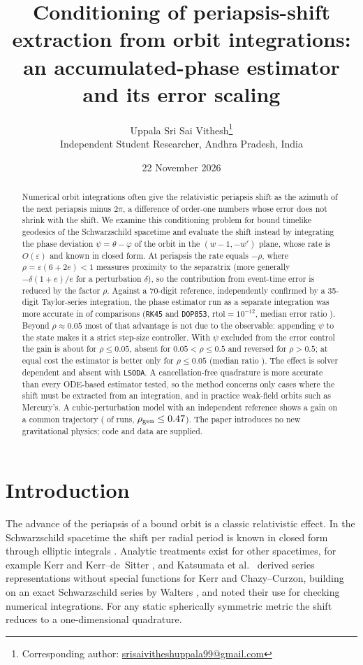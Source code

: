\documentclass[11pt,a4paper]{article}
\title{Conditioning of periapsis-shift extraction from orbit integrations:\\
an accumulated-phase estimator and its error scaling}
\author{Uppala Sri Sai Vithesh\thanks{Corresponding author: \href{mailto:srisaivitheshuppala99@gmail.com}{srisaivitheshuppala99@gmail.com}}\\
\small Independent Student Researcher, Andhra Pradesh, India}
\date{22 November 2026}
\begin{document}
\maketitle

\begin{abstract}
Numerical orbit integrations often give the relativistic periapsis shift as the azimuth of the next periapsis minus $2\pi$, a difference of order-one numbers whose error does not shrink with the shift. We examine this conditioning problem for bound timelike geodesics of the Schwarzschild spacetime and evaluate the shift instead by integrating the phase deviation $\psi=\theta-\varphi$ of the orbit in the $(w-1,-w')$ plane, whose rate is $O(\varepsilon)$ and known in closed form. At periapsis the rate equals $-\rho$, where $\rho=\varepsilon(6+2e)<1$ measures proximity to the separatrix (more generally $-\delta(1+e)/e$ for a perturbation $\delta$), so the contribution from event-time error is reduced by the factor $\rho$. Against a 70-digit reference, independently confirmed by a 35-digit Taylor-series integration, the phase estimator run as a separate integration was more accurate in \PooledWins{} of \PooledTotal{} comparisons (\texttt{RK45} and \texttt{DOP853}, $\mathrm{rtol}=10^{-12}$, median error ratio \PooledMedianRatio). Beyond $\rho\approx0.05$ most of that advantage is not due to the observable: appending $\psi$ to the state makes it a strict step-size controller. With $\psi$ excluded from the error control the gain is about \ObsLowMed{} for $\rho\le0.05$, absent for $0.05<\rho\le0.5$ and reversed for $\rho>0.5$; at equal cost the estimator is better only for $\rho\le0.05$ (median ratio \CmLowMed). The effect is solver dependent and absent with \texttt{LSODA}. A cancellation-free quadrature is more accurate than every ODE-based estimator tested, so the method concerns only cases where the shift must be extracted from an integration, and in practice weak-field orbits such as Mercury's. A cubic-perturbation model with an independent reference shows a gain on a common trajectory (\CubicSameWins{} of \CubicSameN{} runs, $\rho_{\rm gen}\le0.47$). The paper introduces no new gravitational physics; code and data are supplied.
\end{abstract}

\section{Introduction}

The advance of the periapsis of a bound orbit is a classic relativistic effect. In the Schwarzschild spacetime the shift per radial period is known in closed form through elliptic integrals \citep{Hall2008}. Analytic treatments exist for other spacetimes, for example Kerr and Kerr--de~Sitter \citep{Kraniotis2006}, and Katsumata et al.\ \citep{Katsumata2025} derived series representations without special functions for Kerr and Chazy--Curzon, building on an exact Schwarzschild series by Walters \citep{Walters2018}, and noted their use for checking numerical integrations. For any static spherically symmetric metric the shift reduces to a one-dimensional quadrature.
\end{document}
